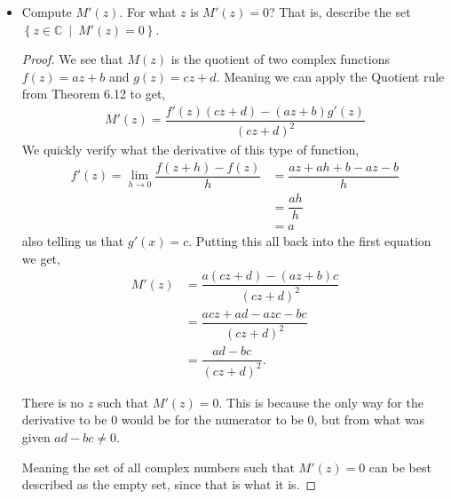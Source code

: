 \documentclass[11pt]{article}
\newenvironment{problem}[2][Problem\!]{\begin{trivlist}
\item[\hskip \labelsep {\bfseries #1}\hskip \labelsep {\bfseries #2}]}{\end{trivlist}}
\newcommand{\cc}{\mathbb C}   %
\newcommand{\setp}[2]{\left\{#1\ \middle|\ #2\right\}} %
\begin{document}
\begin{problem}{3.1}
\begin{itemize}[itemsep=3em]
\item[(c)] Compute $M'(z)$. For what $z$ is $M'(z) = 0$? That is, describe the set $\setp{z \in \cc}{M'(z) = 0}$.
\begin{proof}
  We see that $M(z)$ is the quotient of two complex functions $f(z) = az + b$ and $g(z) = cz + d$. Meaning we can apply the Quotient rule from Theorem 6.12 to get,
  \begin{align*}
    M'(z) = \dfrac{f'(z)(cz + d) - (az+b)g'(z)}{(cz+d)^{2}}
  \end{align*}
  We quickly verify what the derivative of this type of function,
  \begin{align*}
    f'(z) = \lim_{h \to 0}\dfrac{f(z + h) - f(z)}{h} &= \dfrac{az + ah + b - az - b}{h} \\
    &= \dfrac{ah}{h} \\
    &= a
  \end{align*}
  also telling us that $g'(x) = c$.  Putting this all back into the first equation we get,
  \begin{align*}
    M'(z) &= \dfrac{a(cz + d ) - (az + b)c}{(cz + d)^{2}} \\
    &= \dfrac{acz + ad - azc -bc}{(cz + d)^{2}} \\
    &= \dfrac{ad - bc}{(cz + d)^{2}}.
  \end{align*}

  There is no $z$ such that $M'(z) = 0$. This is because the only way for the derivative to be 0 would be for the numerator to be 0, but from what was given $ad - bc \neq 0$.

  Meaning the set of all complex numbers such that $M'(z) = 0$ can be best described as the empty set, since that is what it is. 


\end{proof}

\end{itemize}
\end{problem}

\newpage  %
\end{document}

